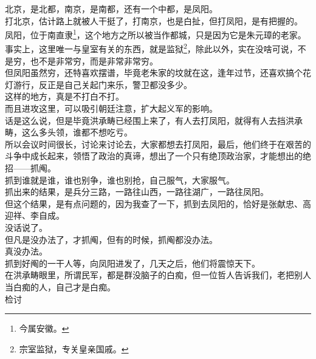 \begin{multicols}{\theparacolNo}
北京，是北都，南京，是南都，还有一个中都，是凤阳。\\

打北京，估计路上就被人干挺了，打南京，也是白扯，但打凤阳，是有把握的。\\

凤阳，位于南直隶\footnote{今属安徽。}，这个地方之所以被当作都城，只是因为它是朱元璋的老家。事实上，这里唯一与皇室有关的东西，就是监狱\footnote{宗室监狱，专关皇亲国戚。}，除此以外，实在没啥可说，不是穷，也不是非常穷，而是非常非常穷。\\

但凤阳虽然穷，还特喜欢摆谱，毕竟老朱家的坟就在这，逢年过节，还喜欢搞个花灯游行，反正是自己关起门来乐，警卫都没多少。\\

这样的地方，真是不打白不打。\\

而且进攻这里，可以吸引朝廷注意，扩大起义军的影响。\\

话是这么说，但是毕竟洪承畴已经围上来了，有人去打凤阳，就得有人去挡洪承畴，这么多头领，谁都不想吃亏。\\

所以会议时间很长，讨论来讨论去，大家都想去打凤阳，最后，他们终于在艰苦的斗争中成长起来，领悟了政治的真谛，想出了一个只有绝顶政治家，才能想出的绝招——抓阄。\\

抓到谁就是谁，谁也别争，谁也别抢，自己服气，大家服气。\\

抓出来的结果，是兵分三路，一路往山西，一路往湖广，一路往凤阳。\\

但这个结果，是有点问题的，因为我查了一下，抓到去凤阳的，恰好是张献忠、高迎祥、李自成。\\

没话说了。\\

但凡是没办法了，才抓阄，但有的时候，抓阄都没办法。\\

真没办法。\\

抓到好阄的一干人等，向凤阳进发了，几天之后，他们将震惊天下。\\

在洪承畴眼里，所谓民军，都是群没脑子的白痴，但一位哲人告诉我们，老把别人当白痴的人，自己才是白痴。\\

检讨\\


\end{multicols}
